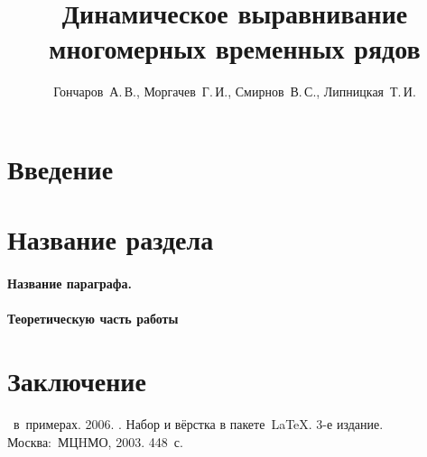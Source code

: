 \documentclass[12pt,twoside]{article}
\title
        {Динамическое выравнивание многомерных временных рядов}
\author
        {Гончаров~А.\,В., Моргачев~Г.\,И., Смирнов~В.\,С., Липницкая~Т.\,И.} %
\begin{document}
    \maketitle
    \section{Введение}
    \section{Название раздела}
    \paragraph{Название параграфа.}
    \paragraph{Теоретическую часть работы}
    \section{Заключение}

    
    

    \begin{thebibliography}{1}
       \LaTeXe\ в~примерах.
       2006.
       .
        Набор и вёрстка в пакете~\LaTeX.
       3-е издание.
       Москва:~МЦHМО, 2003.  448~с.
    \end{thebibliography}
    
    
\end{document}
